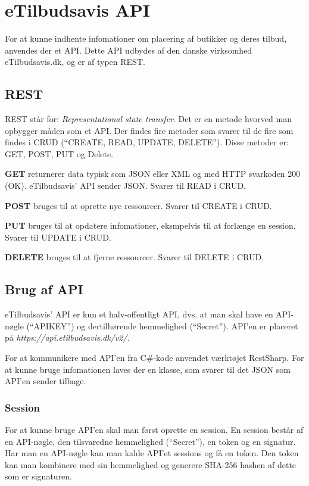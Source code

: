 \chapter{eTilbudsavis API}\label{api}
For at kunne indhente infomationer om placering af butikker og deres tilbud, anvendes der et API.
Dette API udbydes af den danske virksomhed eTilbudsavis.dk, og er af typen REST.

\section{REST}
REST står for: \textit{Representational state transfer}.
Det er en metode hvorved man opbygger måden som et API. 
Der findes fire metoder som svarer til de fire som findes i CRUD (``CREATE, READ, UPDATE, DELETE'').
Disse metoder er: GET, POST, PUT og Delete.

\textbf{GET}
returnerer data typisk som JSON eller XML og med HTTP svarkoden 200 (OK). 
eTilbudsavis' API sender JSON. 
Svarer til READ i CRUD.

\textbf{POST}
bruges til at oprette nye ressourcer.
Svarer til CREATE i CRUD.

\textbf{PUT}
bruges til at opdatere infomationer, eksmpelvis til at forlænge en session.
Svarer til UPDATE i CRUD.

\textbf{DELETE}
bruges til at fjerne ressourcer. 
Svarer til DELETE i CRUD.

\section{Brug af API}
eTilbudsavis' API er kun et halv-offentligt API, dvs. at man skal have en API-nøgle (``APIKEY'') og dertilhørende hemmelighed (``Secret'').
API'en er placeret på \textit{https://api.etilbudsavis.dk/v2/}. \citep{eTilAPI}

For at kommunikere med API'en fra C\#-kode anvendet værktøjet RestSharp. \citep{RestSharp} 
For at kunne bruge infomationen laves der en klasse, som svarer til det JSON som API'en sender tilbage.

\subsection{Session}
For at kunne bruge API'en skal man først oprette en session. 
En session består af en API-nøgle, den tilsvaredne hemmelighed (``Secret''), en token og en signatur.
Har man en API-nøgle kan man kalde API'et sessions og få en token.
Den token kan man kombinere med sin hemmelighed og generere SHA-256 hashen af dette som er signaturen. 


